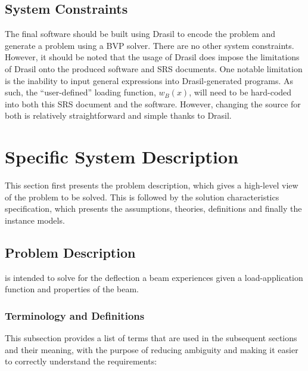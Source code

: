 \documentclass[12pt]{article}
\begin{document}
\subsection{System Constraints}

The final software should be built using Drasil to encode the problem and
generate a problem using a BVP solver. There are no other system constraints.
However, it should be noted that the usage of Drasil does impose the limitations
of Drasil onto the produced software and SRS documents. One notable limitation
is the inability to input general expressions into Drasil-generated programs. As
such, the ``user-defined'' loading function, \(w_{B}(x)\), will need to be
hard-coded into both this SRS document and the software. However, changing the
source for both is relatively straightforward and simple thanks to Drasil.

\newpage


\section{Specific System Description}
\label{sec_ssd}

This section first presents the problem description, which gives a high-level
view of the problem to be solved.  This is followed by the solution
characteristics specification, which presents the assumptions, theories,
definitions and finally the instance models.

\subsection{Problem Description}
\label{Sec_pd}

\progname{} is intended to solve for the deflection a beam experiences given a
load-application function and properties of the beam.

\subsubsection{Terminology and  Definitions}

This subsection provides a list of terms that are used in the subsequent
sections and their meaning, with the purpose of reducing ambiguity and making it
easier to correctly understand the requirements:
\end{document}
